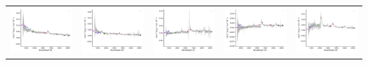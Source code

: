 \begin{center}
\begin{longtable}{l l l l l }
    \includegraphics[width=0.19\linewidth, clip]{Figs/Figs-sdss/spec-7856-57260-0204-STRIPE82-0018-064634.pdf} & \includegraphics[width=0.19\linewidth, clip]{Figs/Figs-sdss/spec-7864-56979-0753-STRIPE82-0008-034263.pdf} & \includegraphics[width=0.19\linewidth, clip]{Figs/Figs-sdss/spec-7866-57002-0979-STRIPE82-0014-010956.pdf} & \includegraphics[width=0.19\linewidth, clip]{Figs/Figs-sdss/spec-7868-57006-0207-STRIPE82-0015-016996.pdf} & \includegraphics[width=0.19\linewidth, clip]{Figs/Figs-sdss/spec-7868-57006-0691-STRIPE82-0014-014477.pdf} \\

\end{longtable}
\end{center}
